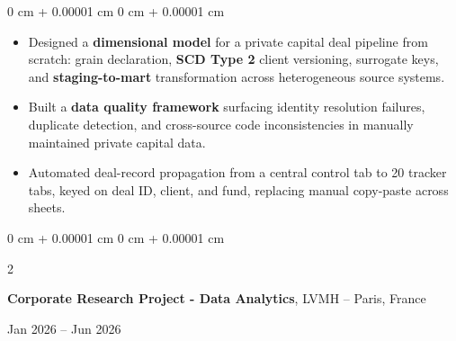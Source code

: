 \documentclass[10pt, letterpaper]{article}
\newenvironment{highlights}{
    \begin{itemize}[
        topsep=0.04 cm,
        parsep=0.02cm,
        partopsep=0pt,
        itemsep=0pt,
        leftmargin=0 cm + 10pt
    ]
}{
    \end{itemize}
} %
\newcommand{\stronglink}[2]{%
    \href{#1}{\textbf{\uline{\textcolor{blue}{#2}}}}%
}
\newenvironment{onecolentry}{
    \begin{adjustwidth}{
        0 cm + 0.00001 cm
    }{
        0 cm + 0.00001 cm
    }
}{
    \end{adjustwidth}
} %
\newenvironment{twocolentry}[2][]{
    \onecolentry
    \def\secondColumn{#2}
    \setcolumnwidth{\fill, 3.8 cm}
    \begin{paracol}{2}
}{
    \switchcolumn \raggedleft \secondColumn
    \end{paracol}
    \endonecolentry
} %
\begin{document}
        \vspace{0.10 cm}
        \begin{onecolentry}
            \begin{highlights}
                \item Designed a \textbf{dimensional model} for a private capital deal pipeline from scratch: grain declaration, \textbf{SCD Type 2} client versioning, surrogate keys, and \textbf{staging-to-mart} transformation across heterogeneous source systems.
                \item Built a \textbf{data quality framework} surfacing identity resolution failures, duplicate detection, and cross-source code inconsistencies in manually maintained private capital data.
                \item Automated deal-record propagation from a central control tab to 20 tracker tabs, keyed on deal ID, client, and fund, replacing manual copy-paste across sheets.
            \end{highlights}
        \end{onecolentry}

    \vspace{0.2 cm}

        \begin{twocolentry}{
            Jan 2026 – Jun 2026
        }
        \textbf{Corporate Research Project - Data Analytics}, LVMH -- Paris, France \hfill
        \end{twocolentry}
\end{document}
